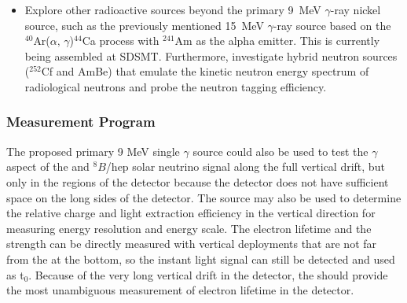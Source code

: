 \begin{itemize}
\item Explore other radioactive sources beyond the primary %
\SI{9}{\MeV} $\gamma$-ray nickel source, such as the previously mentioned \SI{15}{\MeV} $\gamma$-ray source based on the  $^{40}$Ar($\alpha,\,\gamma$)$^{44}$Ca process with $^{241}$Am as the alpha emitter. This is currently being assembled at SDSMT.
Furthermore, investigate hybrid neutron sources ($^{252}$Cf and AmBe) that emulate the kinetic neutron energy spectrum of radiological neutrons and probe the neutron tagging efficiency.
\end{itemize}

\subsubsection{Measurement Program}
\label{sec:dp-calib-sys-src-dep-meas}
The proposed primary 9 MeV single $\gamma$ source could also be used to test the $\gamma$ aspect of the  and $^{8}B$/hep solar neutrino signal 
along the full vertical drift, but only in the \endwall regions of the detector because the detector does not have sufficient space on the long sides of the detector. 
The source may also be used to determine the relative charge and light extraction efficiency in the vertical direction for measuring energy resolution and energy scale. The electron lifetime and the \efield strength can be directly measured with vertical deployments that are not far from the  at the bottom, so the instant light signal can still be detected and used as t$_0$. Because of the very long vertical drift in the  detector, the  should provide the most unambiguous measurement of electron lifetime in the  detector.


